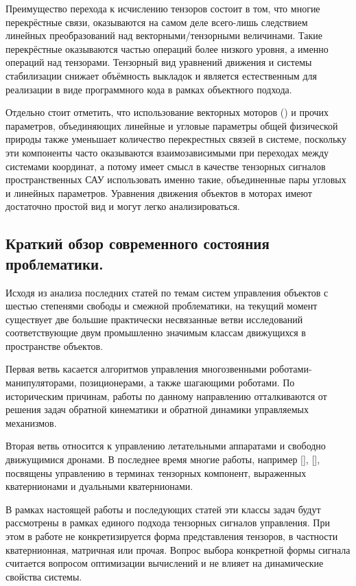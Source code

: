 \documentclass[a4paper]{article}
\begin{document}
Преимущество перехода к исчислению тензоров состоит в том, что многие перекрёстные связи, оказываются на самом деле всего-лишь следствием линейных преобразований над векторными/тензорными величинами. Такие перекрёстные оказываются частью операций более низкого уровня, а именно операций над тензорами. Тензорный вид уравнений движения и системы стабилизации снижает объёмность выкладок и является естественным для реализации в виде программного кода в рамках объектного подхода. 

Отдельно стоит отметить, что использование векторных моторов (\cite{motor}) и прочих параметров, объединяющих линейные и угловые параметры общей физической природы также уменьшает количество перекрестных связей в системе, поскольку эти компоненты часто оказываются взаимозависимыми при переходах между системами координат, а потому имеет смысл в качестве тензорных сигналов пространственных САУ использовать именно такие, объединенные пары угловых и линейных параметров. Уравнения движения объектов в моторах имеют достаточно простой вид и могут легко анализироваться.

\subsection{Краткий обзор современного состояния проблематики.}
Исходя из анализа последних статей по темам систем управления объектов с шестью степенями свободы и смежной проблематики, на текущий момент существует две большие практически несвязанные ветви исследований соответствующие двум промышленно значимым классам движущихся в пространстве объектов. 

Первая ветвь касается алгоритмов управления многозвенными роботами-манипуляторами, позиционерами, а также шагающими роботами. По историческим причинам, работы по данному направлению отталкиваются от решения задач обратной кинематики и обратной динамики управляемых механизмов.

Вторая ветвь относится к управлению летательными аппаратами и свободно движущимися дронами. В последнее время многие работы, например [], [], посвящены управлению в терминах тензорных компонент, выраженных кватернионами и дуальными кватернионами.

В рамках настоящей работы и последующих статей эти классы задач будут рассмотрены в рамках единого подхода тензорных сигналов управления. При этом в работе не конкретизируется форма представления тензоров, в частности кватернионная, матричная или прочая. Вопрос выбора конкретной формы сигнала считается вопросом оптимизации вычислений и не влияет на динамические свойства системы. 
\end{document}
